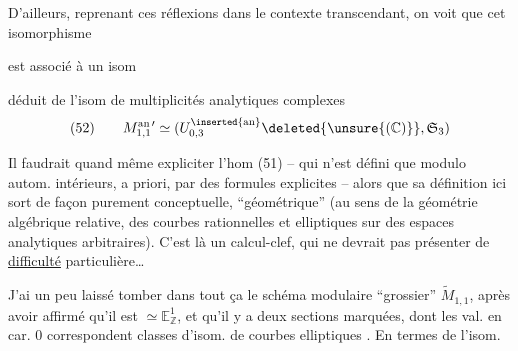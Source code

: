 

D'ailleurs, reprenant ces réflexions dans le
contexte transcendant, on voit que
cet isomorphisme


est associé à un isom


déduit de l'isom de multiplicités analytiques
complexes
\[
(52)\qquad M_{1,1}^{\mathrm{an}\,\prime}\simeq
(U_{0,3}^{\inserted{\mathrm{an}}}\deleted{\unsure{(\mathbb C)}},\mathfrak S_3)
\]

Il faudrait quand même expliciter
l'hom (51) -- qui n'est défini que
modulo autom. intérieurs, a priori,
par des formules explicites -- alors que
sa définition ici sort de façon purement conceptuelle, ``géométrique'' (au sens
de la géométrie algébrique relative, des
courbes rationnelles et elliptiques sur des
espaces analytiques arbitraires). C'est là
un calcul-clef,  qui ne devrait pas
présenter de \uline{difficulté} particulière\ldots

J'ai un peu laissé tomber  dans tout
ça le schéma modulaire ``grossier'' $\widetilde M_{1,1}$,
après avoir affirmé qu'il est $\simeq\mathbb E_{\mathbb Z}^{1}$, et
qu'il y a deux sections marquées,
dont les  val. en car. $0$ correspondent
  classes d'isom. de courbes elliptiques
. En termes de l'isom.
